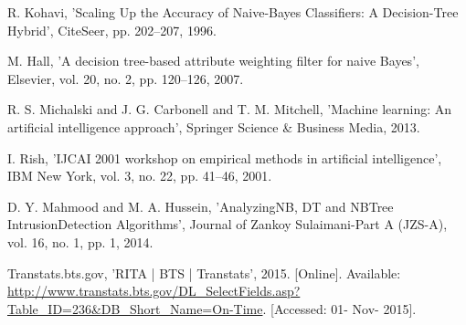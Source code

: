 \documentclass[10pt,conference]{IEEEtran}
\begin{document}
\begin{thebibliography}{1}

   R. Kohavi, 'Scaling Up the Accuracy of Naive-Bayes Classifiers: A Decision-Tree Hybrid',
  CiteSeer, pp. 202--207, 1996.
  
   M. Hall, 'A decision tree-based attribute weighting filter for naive Bayes',
  Elsevier, vol. 20, no. 2, pp. 120--126, 2007.
  
   R. S. Michalski and J. G. Carbonell and T. M. Mitchell, 'Machine learning: An artificial intelligence approach', Springer Science \& Business Media, 2013.

	 I. Rish, 'IJCAI 2001 workshop on empirical methods in artificial intelligence', IBM New York, 
  vol. 3, no. 22, pp. 41--46, 2001.
  
   D. Y. Mahmood and M. A. Hussein, 'AnalyzingNB, DT and NBTree IntrusionDetection Algorithms', Journal of Zankoy Sulaimani-Part A (JZS-A), 
  vol. 16, no. 1, pp. 1, 2014.
    
  Transtats.bts.gov, 'RITA | BTS | Transtats', 2015. [Online]. Available: \url{http://www.transtats.bts.gov/DL_SelectFields.asp?Table_ID=236&DB_Short_Name=On-Time}. [Accessed: 01- Nov- 2015].
  
  \end{thebibliography}

%
%
%
\end{document}
